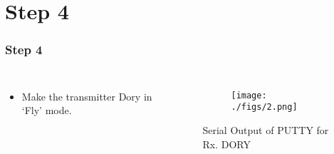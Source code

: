 \documentclass{beamer}
\begin{document}
\section{Step 4}
\begin{frame}
\frametitle{Step 4}
\begin{columns}

  \begin{itemize}
  \item  Make the transmitter Dory in ‘Fly’ mode.
  
  
  \end{itemize}
  \begin{figure}[h!]
  \centering
  \begin{subfigure}[b]{0.75\linewidth}
    \texttt{[image: ./figs/2.png]}
  \end{subfigure}

  \caption{Serial Output of PUTTY for Rx. DORY}
\end{figure}
  
\end{columns}



\end{frame}
\end{document}
